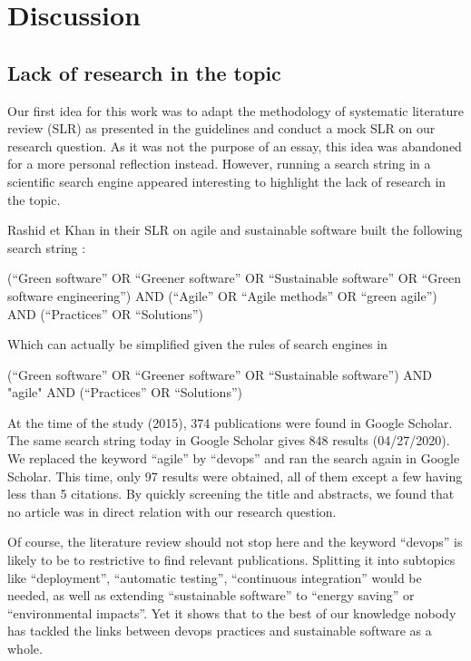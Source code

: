\documentclass[11pt,twocolumn]{article}
\begin{document}
\section{Discussion}
\subsection{Lack of research in the topic}
\label{lack_research}
Our first idea for this work was to adapt the methodology of systematic literature review (SLR) as presented in the guidelines \cite{kitchenhamGuidelinesPerformingSystematic2007} and conduct a mock SLR on our research question. As it was not the purpose of an essay, this idea was abandoned for a more personal reflection instead. However, running a search string in a scientific search engine appeared interesting to highlight the lack of research in the topic.

Rashid et Khan in their SLR on agile and sustainable software built the following search string \cite{rashidAgilePracticesGlobal2018}:

(“Green software” OR “Greener software” OR “Sustainable software” OR “Green software engineering”) AND (“Agile” OR “Agile methods” OR “green agile”) AND (“Practices” OR “Solutions”)

Which can actually be simplified given the rules of search engines in

(“Green software” OR “Greener software” OR “Sustainable software”) AND "agile" AND (“Practices” OR “Solutions”)


At the time of the study (2015), 374 publications were found in Google Scholar. The same search string today in Google Scholar gives 848 results (04/27/2020). We replaced the keyword “agile'' by “devops'' and ran the search again in Google Scholar. This time, only 97 results were obtained, all of them except a few having less than 5 citations. By quickly screening the title and abstracts, we found that no article was in direct relation with our research question.

Of course, the literature review should not stop here and the keyword “devops'' is likely to be to restrictive to find relevant publications. Splitting it into subtopics like “deployment'', “automatic testing'', “continuous integration'' would be needed, as well as extending “sustainable software'' to “energy saving'' or “environmental impacts''. Yet it shows that to the best of our knowledge nobody has tackled the links between devops practices and sustainable software as a whole.
\end{document}
